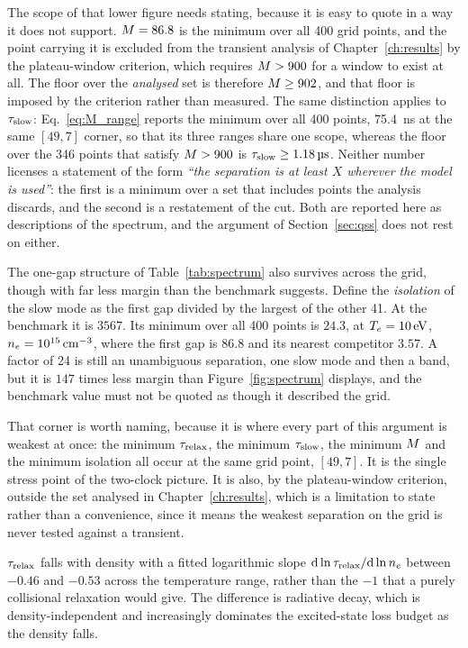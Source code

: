 The scope of that lower figure needs stating, because it is easy to quote in a
way it does not support. $M = 86.8$ is the minimum over all 400 grid points,
and the point carrying it is excluded from the transient analysis of
Chapter~\ref{ch:results} by the plateau-window criterion, which requires
$M > 900$ for a window to exist at all. The floor over the \emph{analysed}
set is therefore $M \ge 902$, and that floor is imposed by the criterion
rather than measured. The same distinction applies to $\tau_{\mathrm{slow}}$: Eq.~\eqref{eq:M_range} reports
the minimum over all 400 points, \SI{75.4}{\nano\second} at the same $[49,7]$
corner, so that its three ranges share one scope, whereas the floor over the
346 points that satisfy $M > 900$ is
$\tau_{\mathrm{slow}} \ge \SI{1.18}{\micro\second}$. Neither number licenses a statement of the form
\emph{\enquote{the separation is at least $X$ wherever the model is used}}: the
first is a minimum over a set that includes points the analysis discards, and
the second is a restatement of the cut. Both are reported here as descriptions
of the spectrum, and the argument of Section~\ref{sec:qss} does not rest on
either.

The one-gap structure of Table~\ref{tab:spectrum} also survives across the grid,
though with far less margin than the benchmark suggests. Define the
\emph{isolation} of the slow mode as the first gap divided by the largest of the
other 41. At the benchmark it is $3567$. Its minimum over all 400 points is
$24.3$, at $T_e = \SI{10}{\electronvolt}$, $n_e =
\SI{e15}{\per\cubic\centi\metre}$, where the first gap is $86.8$ and its nearest
competitor $3.57$. A factor of 24 is still an unambiguous separation, one slow
mode and then a band, but it is $147$ times less margin than
Figure~\ref{fig:spectrum} displays, and the benchmark value must not be quoted as
though it described the grid.

That corner is worth naming, because it is where every part of this argument is
weakest at once: the minimum $\tau_{\mathrm{relax}}$, the minimum $\tau_{\mathrm{slow}}$, the minimum
$M$ and the minimum isolation all occur at the same grid point, $[49,7]$.
It is the single stress point of the two-clock picture. It is also, by the
plateau-window criterion, outside the set analysed in
Chapter~\ref{ch:results}, which is a limitation to state rather than a
convenience, since it means the weakest separation on the grid is never tested
against a transient.

$\tau_{\mathrm{relax}}$ falls with density with a fitted logarithmic slope
$\mathrm{d}\ln\tau_{\mathrm{relax}}/\mathrm{d}\ln n_e$ between $-0.46$ and $-0.53$ across the
temperature range, rather than the $-1$ that a purely collisional relaxation
would give. The difference is radiative decay,
which is density-independent and increasingly dominates the excited-state loss
budget as the density falls.

